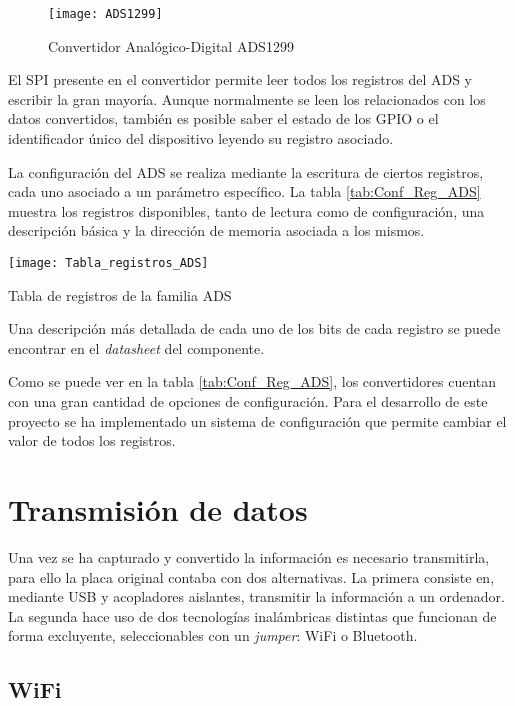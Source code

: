 \begin{figure} [h]
    \centering
    \texttt{[image: ADS1299]}
    \caption{Convertidor Analógico-Digital ADS1299}
    \label{fig:ADS1299}
\end{figure}

El \acrshort{SPI} presente en el convertidor permite leer todos los registros del ADS y escribir la gran mayoría. Aunque normalmente se leen los relacionados con los datos convertidos, también es posible saber el estado de los \acrshort{GPIO} o el identificador único del dispositivo leyendo su registro asociado.

La configuración del ADS se realiza mediante la escritura de ciertos registros, cada uno asociado a un parámetro específico. La tabla \ref{tab:Conf_Reg_ADS} muestra los registros disponibles, tanto de lectura como de configuración, una descripción básica y la dirección de memoria asociada a los mismos.

\begin{table} [h]
    \centering
    \texttt{[image: Tabla\_registros\_ADS]}
    \caption{Tabla de registros de la familia ADS}
    \label{tab:Conf_Reg_ADS}
\end{table}

Una descripción más detallada de cada uno de los bits de cada registro se puede encontrar en el \textit{datasheet} del componente.

Como se puede ver en la tabla \ref{tab:Conf_Reg_ADS}, los convertidores cuentan con una gran cantidad de opciones de configuración. Para el desarrollo de este proyecto se ha implementado un sistema de configuración que permite cambiar el valor de todos los registros.

\section{Transmisión de datos\label{sec:Transmisión_N}}

Una vez se ha capturado y convertido la información es necesario transmitirla, para ello la placa original contaba con dos alternativas. La primera consiste en, mediante \acrshort{USB} y acopladores aislantes, transmitir la información a un ordenador. 
\\La segunda hace uso de dos tecnologías inalámbricas distintas que funcionan de forma excluyente, seleccionables con un \textit{jumper}: WiFi o Bluetooth.

\subsection{WiFi\label{sec:WiFi_N}}

